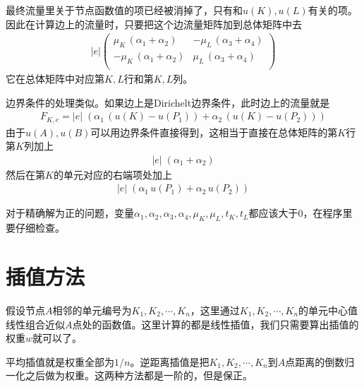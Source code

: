 \documentclass[12pt,a4paper]{article}
\begin{document}
最终流量里关于节点函数值的项已经被消掉了，只有和$u(K), u(L)$有关的项。因此在计算边上的流量时，只要把这个边流量矩阵加到总体矩阵中去
\begin{align*}
|e|
\left(
\begin{matrix}
\mu_K \, (\alpha_1 + \alpha_2) & -\mu_L \, (\alpha_3 + \alpha_4) \\
-\mu_K \, (\alpha_1 + \alpha_2) & \mu_L \, (\alpha_3 + \alpha_4) \\
\end{matrix}
\right)
\end{align*}
它在总体矩阵中对应第$K,L$行和第$K,L$列。


边界条件的处理类似。如果边上是Dirichelt边界条件，此时边上的流量就是
\begin{align*}
F_{K, e} = |e| \; (\alpha_1 \, (u(K) - u(P_1)) + \alpha_2 \, (u(K) - u(P_2)))
\end{align*}
由于$u(A),u(B)$可以用边界条件直接得到，这相当于直接在总体矩阵的第$K$行第$K$列加上
\begin{align*}
|e| \; (\alpha_1 + \alpha_2)
\end{align*}
然后在第$K$的单元对应的右端项处加上
\begin{align*}
|e| \; (\alpha_1 \, u(P_1) + \alpha_2 \,  u(P_2))
\end{align*}

对于精确解为正的问题，变量$\alpha_1,\alpha_2,\alpha_3,\alpha_4,\mu_{K},\mu_{L},t_{K},t_{L}$都应该大于$0$，在程序里要仔细检查。

\section*{插值方法}

假设节点$A$相邻的单元编号为$K_1, K_2, \cdots, K_n$，这里通过$K_1, K_2, \cdots, K_n$的单元中心值线性组合近似$A$点处的函数值。这里计算的都是线性插值，我们只需要算出插值的权重$w$就可以了。

平均插值就是权重全部为$1/n$。逆距离插值是把$K_1, K_2, \cdots, K_n$到$A$点距离的倒数归一化之后做为权重。这两种方法都是一阶的，但是保正。
\end{document}
